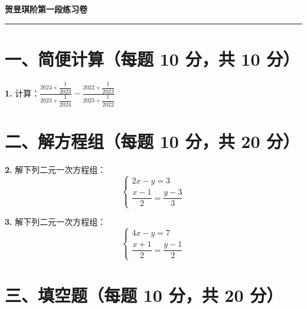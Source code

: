 \documentclass[UTF8,12pt,a4paper]{ctexart}
\begin{document}
\begin{center}
{\LARGE \textbf{贺昱琪阶第一段练习卷}} \\
\vspace{0.6cm}

\vspace{0.4cm}
\hrule
\end{center}
\vspace{0.5cm}

\section*{一、简便计算（每题 10 分，共 10 分）}
\vspace{0.3cm}

\noindent \textbf{1.} 计算：$\displaystyle \frac{2024 + \dfrac{1}{2023}}{2023 + \dfrac{1}{2024}} - \frac{2022 + \dfrac{1}{2023}}{2023 + \dfrac{1}{2022}}$
\vspace{2.5cm}

\section*{二、解方程组（每题 10 分，共 20 分）}
\vspace{0.3cm}

\noindent \textbf{2.} 解下列二元一次方程组：
\[
\begin{cases} 
2x - y = 3 \\ 
\dfrac{x-1}{2} = \dfrac{y-3}{3} 
\end{cases}
\]
\vspace{3.5cm}

\noindent \textbf{3.} 解下列二元一次方程组：
\[
\begin{cases} 
4x - y = 7 \\ 
\dfrac{x+1}{2} = \dfrac{y-1}{2} 
\end{cases}
\]
\vspace{3.5cm}


\section*{三、填空题（每题 10 分，共 20 分）}
\vspace{0.3cm}
\end{document}
